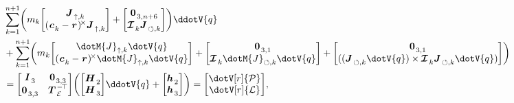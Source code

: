 \begin{equation}
\begin{aligned}
    &\sum_{k=1}^{n+1}
    \left(
        m_k
        \begin{bmatrix}
            \M{J}_{\TRAN,k}                     \\
            \CROSS[(\V{c}_k - \V{r})] \M{J}_{\TRAN,k}\\
        \end{bmatrix}
        +
        \begin{bmatrix}
            \M{0}_{3,n+6}                                              \\
            \INERTIA_k \M{J}_{\ROT,k}\\
        \end{bmatrix}
    \right)
    \ddotV{q}
    \\
    &+
    \sum_{k=1}^{n+1}
    \left(
        m_k
        \begin{bmatrix}
            \dotM{J}_{\TRAN,k} \dotV{q}                     \\
            \CROSS[(\V{c}_k - \V{r})] \dotM{J}_{\TRAN,k} \dotV{q}\\
        \end{bmatrix}
        +
        \begin{bmatrix}
            \M{0}_{3,1}                                              \\
            \INERTIA_k \dotM{J}_{\ROT,k} \dotV{q}\\
        \end{bmatrix}
        +
        \begin{bmatrix}
            \M{0}_{3,1}                                              \\
            ((\M{J}_{\ROT,k} \dotV{q}) \CROSS \INERTIA_k \M{J}_{\ROT,k} \dotV{q})\\
        \end{bmatrix}
    \right)
    \\
    &=
    \begin{bmatrix}
        \M{I}_3   &   \M{0}_{3,3} \\
        \M{0}_{3,3}   &   \TI{\Teuler}\\
    \end{bmatrix}
    \left(
        \begin{bmatrix}
            \M{H}_2\\
            \M{H}_3\\
        \end{bmatrix}
        \ddotV{q}
        +
        \begin{bmatrix}
            \M{h}_2\\
            \M{h}_3\\
        \end{bmatrix}
    \right)
    =
    \begin{bmatrix}
        \dotV[r]{\LM}\\
        \dotV[r]{\AM}
    \end{bmatrix},
\end{aligned}
\end{equation}
